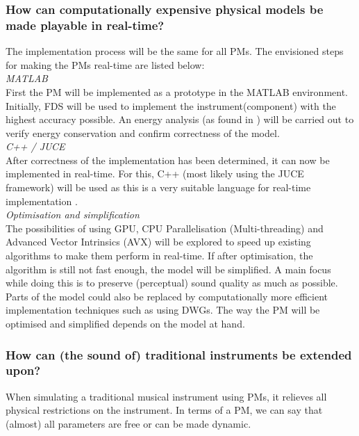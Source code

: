 \subsubsection*{How can computationally expensive physical models be made playable in real-time?}
The implementation process will be the same for all PMs. The envisioned steps for making the PMs real-time are listed below:
\\

\noindent\textit{MATLAB}
\vspace{0.15cm}
\\
\noindent First the PM will be implemented as a prototype in the MATLAB environment. Initially, FDS will be used to implement the instrument(component) with the highest accuracy possible. An energy analysis (as found in \cite{Bilbao2009}) will be carried out to verify energy conservation and confirm correctness of the model.
\\

\noindent\textit{C++ / JUCE}
\vspace{0.15cm}
\\
\noindent 
After correctness of the implementation has been determined, it can now be implemented in real-time. For this, C++ (most likely using the JUCE framework) will be used as this is a very suitable language for real-time implementation \cite{Meyers2005}.
\\

\noindent\textit{Optimisation and simplification}
\vspace{0.15cm}
\\
\noindent 
The possibilities of using GPU, CPU Parallelisation (Multi-threading) and Advanced Vector Intrinsics (AVX) will be explored to speed up existing algorithms to make them perform in real-time. If after optimisation, the algorithm is still not fast enough, the model will be simplified. A main focus while doing this is to preserve (perceptual) sound quality as much as possible. Parts of the model could also be replaced by computationally more efficient implementation techniques such as using DWGs. The way the PM will be optimised and simplified depends on the model at hand. 

\subsubsection*{How can (the sound of) traditional instruments be extended upon?}

When simulating a traditional musical instrument using PMs, it relieves all physical restrictions on the instrument. In terms of a PM, we can say that (almost) all parameters are free or can be made dynamic.

